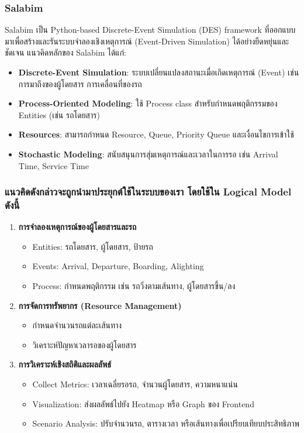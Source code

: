 \subsubsection{Salabim}
Salabim เป็น Python-based Discrete-Event Simulation (DES) framework ที่ออกแบบมาเพื่อสร้างและรันระบบจำลองเชิงเหตุการณ์ (Event-Driven Simulation) ได้อย่างยืดหยุ่นและชัดเจน 
แนวคิดหลักของ Salabim ได้แก่:
\begin{itemize}
    \item \textbf{Discrete-Event Simulation}: ระบบเปลี่ยนแปลงสถานะเมื่อเกิดเหตุการณ์ (Event) เช่น การมาถึงของผู้โดยสาร การเคลื่อนที่ของรถ
    \item \textbf{Process-Oriented Modeling}: ใช้ Process class สำหรับกำหนดพฤติกรรมของ Entities (เช่น รถโดยสาร)
    \item \textbf{Resources}: สามารถกำหนด Resource, Queue, Priority Queue และเงื่อนไขการเข้าใช้
    \item \textbf{Stochastic Modeling}: สนับสนุนการสุ่มเหตุการณ์และเวลาในการรอ เช่น Arrival Time, Service Time
\end{itemize}

\subsubsection{แนวคิดดังกล่าวจะถูกนํามาประยุกต์ใช้ในระบบของเรา โดยใช้ใน Logical Model ดังนี้}
\begin{enumerate}
    \item \textbf{การจำลองเหตุการณ์ของผู้โดยสารและรถ}
    \begin{itemize}
        \item Entities: รถโดยสาร, ผู้โดยสาร, ป้ายรถ
        \item Events: Arrival, Departure, Boarding, Alighting
        \item Process: กำหนดพฤติกรรม เช่น รถวิ่งตามเส้นทาง, ผู้โดยสารขึ้น/ลง
    \end{itemize}
    
    \item \textbf{การจัดการทรัพยากร (Resource Management)}
    \begin{itemize}
        \item กำหนดจำนวนรถแต่ละเส้นทาง
        \item วิเคราะห์ปัญหาเวลารอของผู้โดยสาร 
    \end{itemize}
    
    \item \textbf{การวิเคราะห์เชิงสถิติและผลลัพธ์}
    \begin{itemize}
        \item Collect Metrics: เวลาเฉลี่ยรอรถ, จำนวนผู้โดยสาร, ความหนาแน่น
        \item Visualization: ส่งผลลัพธ์ไปยัง Heatmap หรือ Graph ของ Frontend
        \item Scenario Analysis: ปรับจำนวนรถ, ตารางเวลา หรือเส้นทางเพื่อเปรียบเทียบประสิทธิภาพ
    \end{itemize}
\end{enumerate}

